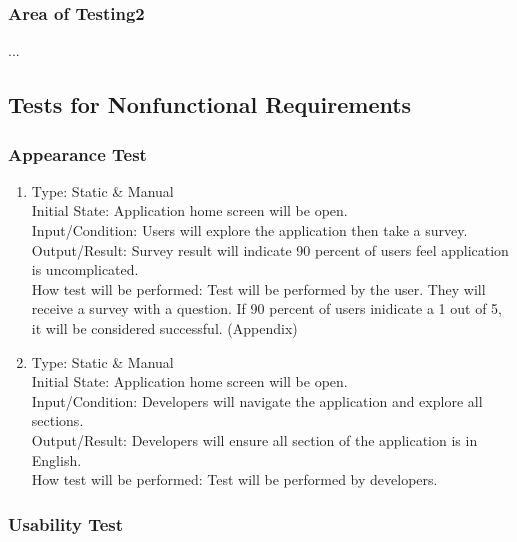 \documentclass[12pt, titlepage]{article}
\begin{document}
\subsubsection{Area of Testing2}

...

\subsection{Tests for Nonfunctional Requirements}

\subsubsection{Appearance Test}

\begin{adjustwidth}{2.2em}{0pt}
\begin{enumerate}[{NF-AT}1.]
    \item Type: Static \& Manual \\
    Initial State: Application home screen will be open.\\
    Input/Condition: Users will explore the application then take a survey.\\
    Output/Result: Survey result will indicate 90 percent of users feel application is uncomplicated. \\
    How test will be performed: Test will be performed by the user. They will receive a survey with a question. If 90 percent of users inidicate a 1 out of 5, it will be considered successful. (Appendix)
    
    \item Type: Static \& Manual\\
    Initial State: Application home screen will be open.\\
    Input/Condition: Developers will navigate the application and explore all sections.\\
    Output/Result: Developers will ensure all section of the application is in English.\\
    How test will be performed: Test will be performed by developers. 
\end{enumerate}
\end{adjustwidth}

\subsubsection{Usability Test}
\end{document}
